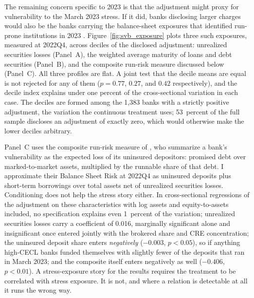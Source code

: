 The remaining concern specific to 2023 is that the adjustment might
proxy for vulnerability to the March 2023 stress.  If it did, banks
disclosing larger charges would also be the banks carrying the
balance-sheet exposures that identified run-prone institutions in 2023
\citep{jiang2024monetary}.  Figure~\ref{fig:svb_exposure} plots three
such exposures, measured at 2022Q4, across deciles of the disclosed
adjustment: unrealized securities losses (Panel~A), the weighted
average maturity of loans and debt securities (Panel~B), and the
composite run-risk measure discussed below (Panel~C).  All three
profiles are flat.  A joint test that the decile means are equal is
not rejected for any of them ($p=0.77$, $0.27$, and $0.42$
respectively), and the decile index explains under one percent of the
cross-sectional variation in each case.  The deciles are formed among
the 1,383 banks with a strictly positive adjustment, the variation the
continuous treatment uses; 53~percent of the full sample discloses an
adjustment of exactly zero, which would otherwise make the lower
deciles arbitrary.

Panel~C uses the composite run-risk measure of
\citet{huberdeau2025adverse}, who summarize a bank's vulnerability as
the expected loss of its uninsured depositors: promised debt over
marked-to-market assets, multiplied by the runnable share of that
debt.  I approximate their Balance Sheet Risk at 2022Q4 as uninsured
deposits plus short-term borrowings over total assets net of
unrealized securities losses.  Conditioning does not help the stress
story either.  In cross-sectional regressions of the adjustment on
these characteristics with log assets and equity-to-assets included,
no specification explains even 1~percent of the variation; unrealized
securities losses carry a coefficient of 0.016, marginally significant
alone and insignificant once entered jointly with the brokered share
and CRE concentration; the uninsured deposit share enters
\emph{negatively} ($-0.003$, $p<0.05$), so if anything high-CECL banks
funded themselves with slightly fewer of the deposits that ran in
March 2023; and the composite itself enters negatively as well
($-0.406$, $p<0.01$).  A stress-exposure story for the results
requires the treatment to be correlated with stress exposure.  It is
not, and where a relation is detectable at all it runs the wrong way.

